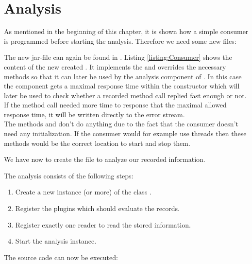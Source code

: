 \section{Analysis}\label{sec:example:analysis}
As mentioned in the beginning of this chapter, it is shown how a simple consumer is programmed before starting the analysis. Therefore we need some new files:

\vspace{1ex}
\vspace{1ex}
		
The new jar-file can again be found in . Listing \ref{listing:Consumer} shows the content of the new created . It implements the  and overrides the necessary methods so that it can later be used by the analysis component of \Kieker. In this case the component gets a maximal response time within the constructor which will later be used to check whether a recorded method call replied fast enough or not. If the method call needed more time to response that the maximal allowed response time, it will be written directly to the error stream.\\
The methods  and  don't do anything due to the fact that the consumer doesn't need any initialization. If the consumer would for example use threads then these methods would be the correct location to start and stop them.

\setJavaCodeListing       


We have now to create the file  to analyze our recorded information.

\setJavaCodeListing       

\notify The analysis consists of the following steps:
\begin{enumerate}
\item Create a new instance (or more) of the class .
\item Register the plugins which should evaluate the records.
\item Register exactly one reader to read the stored information.
\item Start the analysis instance.
\end{enumerate}
The source code can now be executed:

